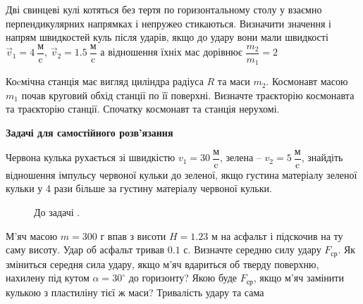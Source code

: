 \begin{problem}{13}
	Дві свинцеві кулі котяться без тертя по горизонтальному столу у взаємно перпендикулярних напрямках і непружео стикаються. Визначити значення і напрям швидкостей куль після ударів, якщо до удару вони мали швидкості $\vec{v}_1 = 4~\dfrac{\text{м}}{\text{c}}$, $\vec{v}_2 = 1.5~\dfrac{\text{м}}{\text{c}}$ а відношення їхніх мас дорівнює $\dfrac{m_2}{m_1} = 2$
\end{problem}



\begin{problem}{15}
	Коcмічна станція має вигляд циліндра радіуса $R$ та маси $m_2$. Космонавт масою $m_1$ почав круговий обхід станції по її поверхні. Визначте траєкторію космонавта та траєкторію станції. Спочатку космонавт та станція нерухомі.
\end{problem}


\textbf{Задачі для самостійного розв'язання}

\begin{problem}{1}
	Червона кулька рухається зі швидкістю $v_1 = 30~\dfrac{\text{м}}{\text{c}}$, зелена -- $v_2 = 5~\dfrac{\text{м}}{\text{c}}$, знайдіть відношення імпульсу червоної кульки до зеленої, якщо густина матеріалу зеленої кульки у 4 рази більше за густину матеріалу червоної кульки.
	
	\begin{figure}[h!]
		\centering
		\caption{До задачі .}
		
	\end{figure}
\end{problem}

\begin{problem}{2}
	М'яч масою $m = 300$ г впав з висоти $H = 1.23$ м на асфальт і підскочив на ту саму висоту. Удар об асфальт тривав $0.1$ с. Визначте середню силу удару $F_{\text{ср}}$. Як зміниться середня сила удару, якщо м'яч вдариться об тверду поверхню, нахилену під кутом $\alpha = 30^{\circ}$ до горизонту? Якою буде $F_{\text{ср}}$, якщо м'яч замінити кулькою з пластиліну тієї ж маси? Тривалість удару та сама
\end{problem}

